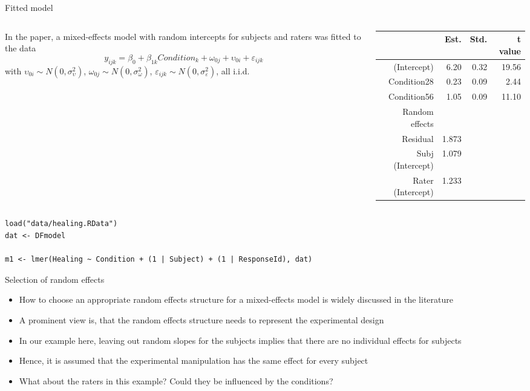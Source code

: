 \documentclass[aspectratio=169]{beamer}
\begin{document}
\begin{frame}[fragile]{Fitted model}
  \begin{columns}
    \begin{column}{.5\textwidth}
    In the paper, a mixed-effects model with random intercepts for subjects and
      raters was fitted to the data
     \[
       y_{ijk} = \beta_0 + \beta_{1k} Condition_k + \omega_{0j} + \upsilon_{0i} +
       \varepsilon_{ijk}
  \]
\small
      with $\upsilon_{0i} \sim N(0, \sigma_{\upsilon}^2)$,
  $\omega_{0j} \sim N(0, \sigma_{\omega}^2)$, $\varepsilon_{ijk} \sim N(0,
  \sigma_{\varepsilon}^2)$, all i.i.d. 
    \end{column}
    \begin{column}{.5\textwidth}
\begin{tabular}{rrrr}
  \hline
 & Est. & Std. & t value \\ 
  \hline
(Intercept) & 6.20 & 0.32 & 19.56 \\ 
  Condition28 & 0.23 & 0.09 & 2.44 \\ 
  Condition56 & 1.05 & 0.09 & 11.10 \\ 
   \hline
   Random effects & & & \\
   \hline
   Residual & 1.873 & & \\
   Subj (Intercept) & 1.079 & & \\
   Rater (Intercept) & 1.233 & & \\
   \hline
\end{tabular}
    \end{column}
  \end{columns}
  \vspace{.5cm}
\begin{lstlisting}
load("data/healing.RData")
dat <- DFmodel

m1 <- lmer(Healing ~ Condition + (1 | Subject) + (1 | ResponseId), dat)
\end{lstlisting}
\end{frame}

\begin{frame}[<+->]{Selection of random effects}
  \begin{itemize}
    \item How to choose an appropriate random effects structure for a
      mixed-effects model is widely discussed in the literature
      \citep[e.\,g.,][]{Barr2013, Gelman2024, Bates2018}
    \item A prominent view is, that the random effects structure needs to
      represent the experimental design
    \item In our example here, leaving out random slopes for the subjects
      implies that there are no individual effects for subjects
    \item Hence, it is assumed that the experimental manipulation has the same
      effect for every subject
    \item What about the raters in this example? Could they be influenced by
      the conditions?
  \end{itemize}
\end{frame}
\end{document}

